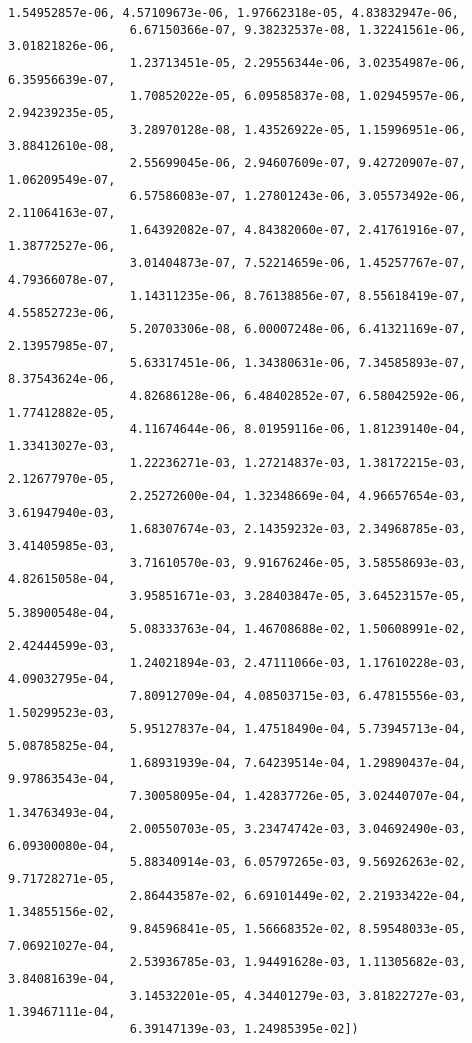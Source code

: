 \documentclass[11pt]{article}
\begin{document}
\begin{Verbatim}[commandchars=\\\{\}]
                 1.54952857e-06, 4.57109673e-06, 1.97662318e-05, 4.83832947e-06,
                 6.67150366e-07, 9.38232537e-08, 1.32241561e-06, 3.01821826e-06,
                 1.23713451e-05, 2.29556344e-06, 3.02354987e-06, 6.35956639e-07,
                 1.70852022e-05, 6.09585837e-08, 1.02945957e-06, 2.94239235e-05,
                 3.28970128e-08, 1.43526922e-05, 1.15996951e-06, 3.88412610e-08,
                 2.55699045e-06, 2.94607609e-07, 9.42720907e-07, 1.06209549e-07,
                 6.57586083e-07, 1.27801243e-06, 3.05573492e-06, 2.11064163e-07,
                 1.64392082e-07, 4.84382060e-07, 2.41761916e-07, 1.38772527e-06,
                 3.01404873e-07, 7.52214659e-06, 1.45257767e-07, 4.79366078e-07,
                 1.14311235e-06, 8.76138856e-07, 8.55618419e-07, 4.55852723e-06,
                 5.20703306e-08, 6.00007248e-06, 6.41321169e-07, 2.13957985e-07,
                 5.63317451e-06, 1.34380631e-06, 7.34585893e-07, 8.37543624e-06,
                 4.82686128e-06, 6.48402852e-07, 6.58042592e-06, 1.77412882e-05,
                 4.11674644e-06, 8.01959116e-06, 1.81239140e-04, 1.33413027e-03,
                 1.22236271e-03, 1.27214837e-03, 1.38172215e-03, 2.12677970e-05,
                 2.25272600e-04, 1.32348669e-04, 4.96657654e-03, 3.61947940e-03,
                 1.68307674e-03, 2.14359232e-03, 2.34968785e-03, 3.41405985e-03,
                 3.71610570e-03, 9.91676246e-05, 3.58558693e-03, 4.82615058e-04,
                 3.95851671e-03, 3.28403847e-05, 3.64523157e-05, 5.38900548e-04,
                 5.08333763e-04, 1.46708688e-02, 1.50608991e-02, 2.42444599e-03,
                 1.24021894e-03, 2.47111066e-03, 1.17610228e-03, 4.09032795e-04,
                 7.80912709e-04, 4.08503715e-03, 6.47815556e-03, 1.50299523e-03,
                 5.95127837e-04, 1.47518490e-04, 5.73945713e-04, 5.08785825e-04,
                 1.68931939e-04, 7.64239514e-04, 1.29890437e-04, 9.97863543e-04,
                 7.30058095e-04, 1.42837726e-05, 3.02440707e-04, 1.34763493e-04,
                 2.00550703e-05, 3.23474742e-03, 3.04692490e-03, 6.09300080e-04,
                 5.88340914e-03, 6.05797265e-03, 9.56926263e-02, 9.71728271e-05,
                 2.86443587e-02, 6.69101449e-02, 2.21933422e-04, 1.34855156e-02,
                 9.84596841e-05, 1.56668352e-02, 8.59548033e-05, 7.06921027e-04,
                 2.53936785e-03, 1.94491628e-03, 1.11305682e-03, 3.84081639e-04,
                 3.14532201e-05, 4.34401279e-03, 3.81822727e-03, 1.39467111e-04,
                 6.39147139e-03, 1.24985395e-02])
\end{Verbatim}
        
\end{document}
